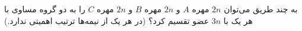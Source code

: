 \EXERCISE
به چند طریق می‌توان
$2n$
مهره
$A$
و
$2n$
مهره
$B$
و
$2n$
مهره
$C$
را به دو گروه مساوی با هر یک با
$3n$
عضو تقسیم کرد؟ (در هر یک از نیمه‌ها ترتیب اهمیتی ندارد.)

